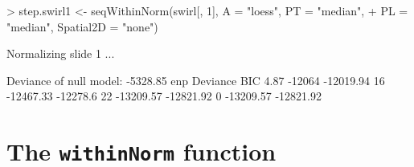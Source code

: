 \documentclass[11pt]{article}
\newcommand{\Rfunc}[1]{{\tt #1}}
\begin{document}
\begin{Schunk}
\begin{Sinput}
> step.swirl1 <- seqWithinNorm(swirl[, 1], A = "loess", PT = "median", 
+     PL = "median", Spatial2D = "none")
\end{Sinput}
\begin{Soutput}
Normalizing slide  1 ...

Deviance of null model: -5328.85 
enp 	 Deviance 	 BIC 
4.87 	 -12064 	 -12019.94 
16 	 -12467.33 	 -12278.6 
22 	 -13209.57 	 -12821.92 
0 	 -13209.57 	 -12821.92 
\end{Soutput}
\end{Schunk}

\section{The \Rfunc{withinNorm} function}
\end{document}
